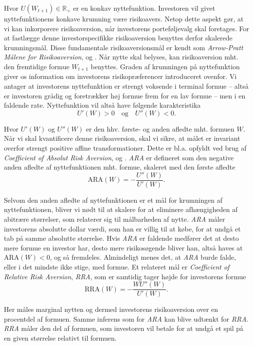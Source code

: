 \documentclass[
  a4paper,
  oneside]{memoir}
\begin{document}
Hvor \(U(W_{t+1})\in\mathbb{R}_+\) er en konkav nyttefunktion. Investoren vil givet nyttefunktionens konkave krumning være risikoavers. Netop dette aspekt gør, at vi kan inkorporere risikoaversion, når investorens porteføljevalg skal foretages. For at fastlægge denne investorspecifikke risikoaversion benyttes derfor skalerede krumningsmål. Disse fundamentale risikoaversionsmål er kendt som \emph{Arrow-Pratt Målene for Risikoaversion}, \citep{Arrow1965} og \citep{Pratt1964}. Når nytte skal belyses, kan risikoaversion mht. den fremtidige formue \(W_{t+1}\) benyttes. Graden af krumningen på nyttefunktion giver os information om investorens risikopræferencer introduceret ovenfor. Vi antager at investorens nyttefunktion er strengt voksende i terminal formue -- altså er investoren grådig og foretrækker høj formue frem for en lav formue -- men i en faldende rate. Nyttefunktion vil altså have følgende karakteristika
\[U'(W)>0\quad\text{og}\quad U''(W)<0.\]

Hvor \(U'(W)\) og \(U''(W)\) er den hhv. første- og anden afledte mht. formuen \(W\). Når vi skal kvantificere denne risikoaversion, skal vi sikre, at målet er invariant overfor strengt positive affine transformationer. Dette er bl.a. opfyldt ved brug af \emph{Coefficient of Absolut Risk Aversion}, \citep{Arrow1965} og \citep{Pratt1964}. \emph{ARA} er defineret som den negative anden afledte af nyttefunktionen mht. formue, skaleret med den første afledte
\[\text{ARA}(W)=-\frac{U''(W)}{U'(W)}.\]

Selvom den anden afledte af nyttefunktionen er et mål for krumningen af nyttefunktionen, bliver vi nødt til at skalere for at eliminere afhængigheden af abitrære størrelser, som relaterer sig til målbarheden af nytte. \emph{ARA} måler investorens absolutte dollar værdi, som han er villig til at købe, for at undgå et tab på samme absolutte størrelse. Hvis \emph{ARA} er faldende medfører det at desto mere formue en investor har, desto mere risikosøgende bliver han, altså haves at \(\text{ARA}(W)<0\), og så fremdeles. Almindeligt menes det, at \emph{ARA} burde falde, eller i det mindste ikke stige, med formue. Et relateret mål er \emph{Coefficient of Relative Risk Aversion}, \emph{RRA}, som er samtidig tager højde for investorens formue
\[\text{RRA}(W)=-\frac{WU''(W)}{U'(W)}.\]

Her måles marginal nytten og dermed investorens risikoaversion over en procentdel af formuen. Samme inferens som for \emph{ARA} kan blive udtænkt for \emph{RRA}. \emph{RRA} måler den del af formuen, som investoren vil betale for at undgå et spil på en given størrelse relativt til formuen.
\end{document}

